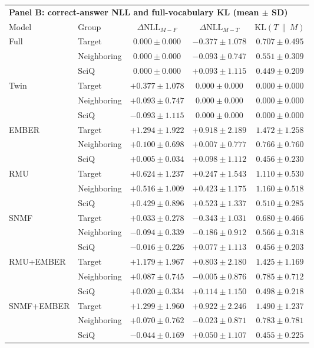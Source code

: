 \begin{table}[h]
  \vspace{1em}
  \begin{tabular}{llccc}
    \toprule
    \multicolumn{5}{l}{\textbf{Panel B: correct-answer NLL and full-vocabulary KL (mean $\pm$ SD)}} \\
    \cmidrule(lr){1-5}
    Model & Group & $\Delta\mathrm{NLL}_{M-F}$ & $\Delta\mathrm{NLL}_{M-T}$ & $\mathrm{KL}(T\,\|\,M)$ \\
    \midrule
    Full  & Target      & $0.000 \pm 0.000$ & $-0.377 \pm 1.078$ & $0.707 \pm 0.495$ \\
          & Neighboring & $0.000 \pm 0.000$ & $-0.093 \pm 0.747$ & $0.551 \pm 0.309$ \\
          & SciQ        & $0.000 \pm 0.000$ & $+0.093 \pm 1.115$ & $0.449 \pm 0.209$ \\
    Twin  & Target      & $+0.377 \pm 1.078$ & $0.000 \pm 0.000$ & $0.000 \pm 0.000$ \\
          & Neighboring & $+0.093 \pm 0.747$ & $0.000 \pm 0.000$ & $0.000 \pm 0.000$ \\
          & SciQ        & $-0.093 \pm 1.115$ & $0.000 \pm 0.000$ & $0.000 \pm 0.000$ \\
    EMBER & Target      & $+1.294 \pm 1.922$ & $+0.918 \pm 2.189$ & $1.472 \pm 1.258$ \\
          & Neighboring & $+0.100 \pm 0.698$ & $+0.007 \pm 0.777$ & $0.766 \pm 0.760$ \\
          & SciQ        & $\mathbf{+0.005 \pm 0.034}$ & $+0.098 \pm 1.112$ & $0.456 \pm 0.230$ \\
    RMU   & Target      & $+0.624 \pm 1.237$ & $\mathbf{+0.247 \pm 1.543}$ & $1.110 \pm 0.530$ \\
          & Neighboring & $+0.516 \pm 1.009$ & $+0.423 \pm 1.175$ & $1.160 \pm 0.518$ \\
          & SciQ        & $+0.429 \pm 0.896$ & $+0.523 \pm 1.337$ & $0.510 \pm 0.285$ \\
    SNMF  & Target      & $+0.033 \pm 0.278$ & $-0.343 \pm 1.031$ & $\mathbf{0.680 \pm 0.466}$ \\
          & Neighboring & $-0.094 \pm 0.339$ & $-0.186 \pm 0.912$ & $\mathbf{0.566 \pm 0.318}$ \\
          & SciQ        & $-0.016 \pm 0.226$ & $+0.077 \pm 1.113$ & $0.456 \pm 0.203$ \\
    RMU+EMBER & Target      & $+1.179 \pm 1.967$ & $+0.803 \pm 2.180$ & $1.425 \pm 1.169$ \\
          & Neighboring & $+0.087 \pm 0.745$ & $\mathbf{-0.005 \pm 0.876}$ & $0.785 \pm 0.712$ \\
          & SciQ        & $+0.020 \pm 0.334$ & $+0.114 \pm 1.150$ & $0.498 \pm 0.218$ \\
    SNMF+EMBER & Target      & $\mathbf{+1.299 \pm 1.960}$ & $+0.922 \pm 2.246$ & $1.490 \pm 1.237$ \\
          & Neighboring & $\mathbf{+0.070 \pm 0.762}$ & $-0.023 \pm 0.871$ & $0.783 \pm 0.781$ \\
          & SciQ        & $-0.044 \pm 0.169$ & $\mathbf{+0.050 \pm 1.107}$ & $\mathbf{0.455 \pm 0.225}$ \\
    \bottomrule
  \end{tabular}


\end{table}
